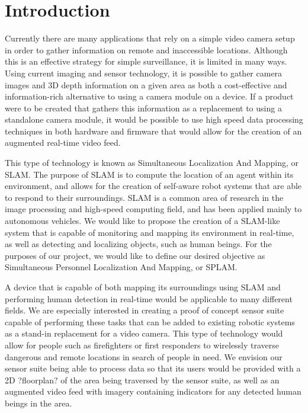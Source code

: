 \section{Introduction}
Currently there are many applications that rely on a simple video camera setup in order to gather information on remote and inaccessible locations. Although this is an effective strategy for simple surveillance, it is limited in many ways. Using current imaging and sensor technology, it is possible to gather camera images and 3D depth information on a given area as both a cost-effective and information-rich alternative to using a camera module on a device. If a product were to be created that gathers this information as a replacement to using a standalone camera module, it would be possible to use high speed data processing techniques in both hardware and firmware that would allow for the creation of an augmented real-time video feed.
\par
This type of technology is known as Simultaneous Localization And Mapping, or SLAM. The purpose of SLAM is to compute the location of an agent within its environment, and allows for the creation of self-aware robot systems that are able to respond to their surroundings. SLAM is a common area of research in the image processing and high-speed computing field, and has been applied mainly to autonomous vehicles. We would like to propose the creation of a SLAM-like system that is capable of monitoring and mapping its environment in real-time, as well as detecting and localizing objects, such as human beings. For the purposes of our project, we would like to define our desired objective as Simultaneous Personnel Localization And Mapping, or SPLAM. 
\par
A device that is capable of both mapping its surroundings using SLAM and performing human detection in real-time would be applicable to many different fields. We are especially interested in creating a proof of concept sensor suite capable of performing these tasks that can be added to existing robotic systems as a stand-in replacement for a video camera. This type of technology would allow for people such as firefighters or first responders to wirelessly traverse dangerous and remote locations in search of people in need. We envision our sensor suite being able to process data so that its users would be provided with a 2D ?floorplan? of the area being traversed by the sensor suite, as well as an augmented video feed with imagery containing indicators for any detected human beings in the area. 
\par
